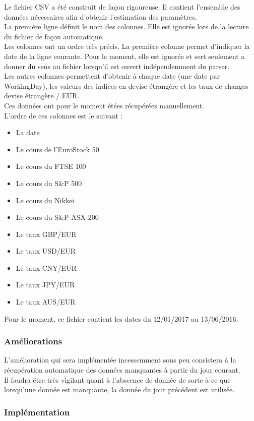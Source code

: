 \documentclass[a4paper,12pt]{article}
\begin{document}
Le fichier CSV a été construit de façon rigoureuse. Il contient l'ensemble des données nécessaires afin d'obtenir l'estimation des paramètres. \\ 
La première ligne définit le nom des colonnes. Elle est ignorée lors de la lecture du fichier de façon automatique. \\ 
Les colonnes ont un ordre très précis. La première colonne permet d'indiquer la date de la ligne courante. Pour le moment, elle est ignorée et sert seulement a donner du sens au fichier lorsqu'il est ouvert indépendemment du parser. \\ 
Les autres colonnes permettent d'obtenir à chaque date (une date par WorkingDay), les valeurs des indices en devise étrangère et les taux de changes devise étrangère / EUR. \\ 
Ces données ont pour le moment étées récupérées manuellement. \\ 
L'ordre de ces colonnes est le suivant :
\begin{itemize}
    \item La date
    \item Le cours de l'EuroStock 50
    \item Le cours du FTSE 100
    \item Le cours du S\&P 500
    \item Le cours du Nikkei 
    \item Le cours du S\&P ASX 200
    \item Le taux GBP/EUR
    \item Le taux USD/EUR
    \item Le taux CNY/EUR
    \item Le taux JPY/EUR 
    \item Le taux AUS/EUR
\end{itemize}

Pour le moment, ce fichier contient les dates du 12/01/2017 au 13/06/2016. 
\subsubsection{Améliorations}

L'amélioration qui sera implémentée incessemment sous peu consistera à la récupération automatique des données manquantes à partir du jour courant. \\ 
Il faudra être très vigilant quant à l'abscence de donnée de sorte à ce que lorsqu'une donnée est manquante, la donnée du jour précédent est utilisée.


\subsubsection{Implémentation}
\end{document}
